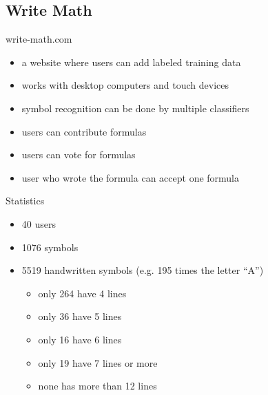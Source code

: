 \subsection{Write Math}

\begin{frame}{write-math.com}
    \begin{itemize}
        \item a website where users can add labeled training data
        \item works with desktop computers and touch devices
        \item symbol recognition can be done by multiple classifiers
        \item users can contribute formulas
        \item users can vote for formulas
        \item user who wrote the formula can accept one formula
    \end{itemize}
\end{frame}


\begin{frame}{Statistics}
    \begin{itemize}
        \item 40 users
        \item 1076 symbols
        \item 5519 handwritten symbols (e.g. 195 times the letter \enquote{A})
        \begin{itemize}
            \item only 264 have 4 lines
            \item only 36 have 5 lines
            \item only 16 have 6 lines
            \item only 19 have 7 lines or more
            \item none has more than 12 lines
        \end{itemize}
    \end{itemize}
\end{frame}

